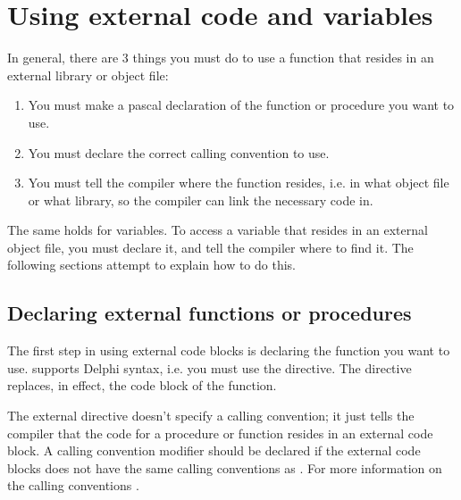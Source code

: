 \section{Using external code and variables}

In general, there are 3 things you must do to use a function that resides in
an external library or object file:
\begin{enumerate}
\item You must make a pascal declaration of the function or procedure you
want to use.
\item You must declare the correct calling convention to use.
\item You must tell the compiler where the function resides, i.e. in what
object file or what library, so the compiler can link the necessary code in.
\end{enumerate}
The same holds for variables. To access a variable that resides in an
external object file, you must declare it, and tell the compiler where to
find it.
The following sections attempt to explain how to do this.


\subsection{Declaring external functions or procedures}
\label{se:ExternalFunction}

The first step in using external code blocks is declaring the function you
want to use. \fpc supports Delphi syntax, i.e. you must use the
 directive. The  directive replaces, in effect,
the code block of the function.

The external directive doesn't specify a calling convention; it just tells
the compiler that the code for a procedure or function resides in an
external code block. A calling convention modifier should be declared
if the external code blocks does not have the same calling conventions
as \fpc. For more information on the calling conventions
.


